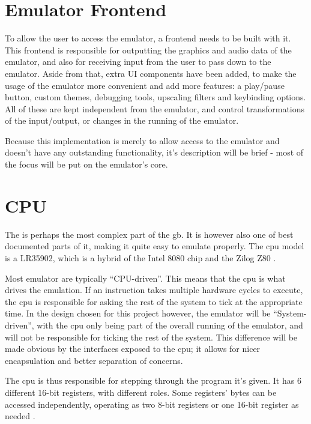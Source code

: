 \documentclass[11pt]{informatics-report}
\begin{document}
\section{Emulator Frontend}

To allow the user to access the emulator, a frontend needs to be built with it. This frontend is responsible for outputting the graphics and audio data of the emulator, and also for receiving input from the user to pass down to the emulator. Aside from that, extra UI components have been added, to make the usage of the emulator more convenient and add more features: a play/pause button, custom themes, debugging tools, upscaling filters and keybinding options. All of these are kept independent from the emulator, and control transformations of the input/output, or changes in the running of the emulator.

Because this implementation is merely to allow access to the emulator and doesn't have any outstanding functionality, it's description will be brief - most of the focus will be put on the emulator's core.

\section{CPU}

The  is perhaps the most complex part of the \gls{gb}. It is however also one of best documented parts of it, making it quite easy to emulate properly. The \gls{cpu} model is a LR35902, which is a hybrid of the Intel 8080 chip and the Zilog Z80 \cite{gbcpumanual}.

Most emulator are typically ``CPU-driven''. This means that the \gls{cpu} is what drives the emulation. If an instruction takes multiple hardware cycles to execute, the \gls{cpu} is responsible for asking the rest of the system to tick at the appropriate time. In the design chosen for this project however, the emulator will be ``System-driven'', with the \gls{cpu} only being part of the overall running of the emulator, and will not be responsible for ticking the rest of the system. This difference will be made obvious by the interfaces exposed to the \gls{cpu}; it allows for nicer encapsulation and better separation of concerns.

The \gls{cpu} is thus responsible for stepping through the program it's given. It has 6 different 16-bit registers, with different roles. Some registers' bytes can be accessed independently, operating as two 8-bit registers or one 16-bit register as needed \cite[CPU Registers and Flags]{pandoc}.
\end{document}
